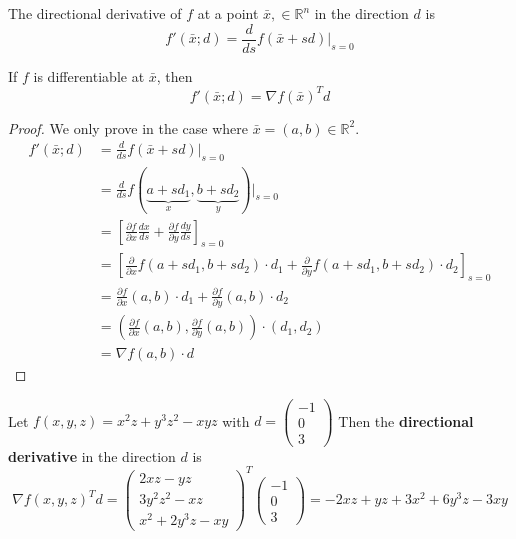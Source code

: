 \begin{definition}
    The directional derivative of $f$ at a point $\bar x, \in \mathbb R^n$ in the direction $d$ is $$f'(\bar x; d) = \frac{d}{ds} f(\bar x + sd) \bigg|_{s = 0}$$
\end{definition}
\begin{theorem}[]
    If $f$ is differentiable at $\bar x$, then $$f'(\bar x; d) = \nabla f(\bar x)^T d$$
\end{theorem}
\begin{proof}[Proof]
    We only prove in the case where $\bar x = (a, b) \in \mathbb R^2$.
    \begin{align*}
        f'(\bar x; d) &= \frac{d}{ds} f(\bar x + sd) \bigg|_{s = 0} \\
        &= \frac{d}{ds} f(\underbrace{a + sd_1}_{x}, \underbrace{b + sd_2}_{y}) \bigg|_{s = 0} \\
        &= \left[\frac{\partial f}{\partial x} \frac{dx}{ds} + \frac{\partial f}{\partial y}\frac{dy}{ds}\right]_{s=0} \tag*{Chain rule}\\
        &= \left[\frac{\partial}{\partial x}f(a + sd_1, b + sd_2) \cdot d_1 + \frac{\partial}{\partial y}f(a + sd_1, b + sd_2) \cdot d_2\right]_{s=0} \\
        &= \frac{\partial f}{\partial x} (a,b) \cdot d_1 + \frac{\partial f}{\partial y}(a,b) \cdot d_2 \\
        &= \left(\frac{\partial f}{\partial x}(a,b), \frac{\partial f}{\partial y} (a,b)\right) \cdot (d_1, d_2) \\
        &= \nabla f(a,b) \cdot d
    \end{align*}
\end{proof}
\begin{problem}
    Let $f(x,y,z) = x^2z + y^3z^2 - xyz$ with $d = \begin{pmatrix}
        -1 \\ 0 \\ 3
    \end{pmatrix}$ Then the \textbf{directional derivative} in the direction $d$ is
    $$\nabla f(x,y,z)^T d = \begin{pmatrix}
        2xz - yz \\
        3y^2z^2 - xz \\
        x^2 + 2y^3z - xy
    \end{pmatrix}^{T} \begin{pmatrix}
        -1 \\ 0 \\ 3
    \end{pmatrix} = -2xz + yz + 3x^2 + 6y^3z - 3xy$$
\end{problem}
